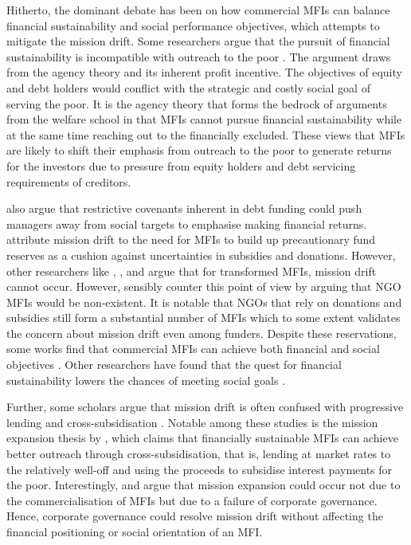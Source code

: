 \documentclass[a4paper, nobind]{templates/ociamthesis}
\begin{document}
Hitherto, the dominant debate has been on how commercial MFIs can balance financial sustainability and social performance objectives, which attempts to mitigate the mission drift. Some researchers argue that the pursuit of financial sustainability is incompatible with outreach to the poor \autocite{cobb2016funding,mia2017mission}. The argument draws from the agency theory and its inherent profit incentive. The objectives of equity and debt holders would conflict with the strategic and costly social goal of serving the poor. It is the agency theory that forms the bedrock of arguments from the welfare school in that MFIs cannot pursue financial sustainability while at the same time reaching out to the financially excluded. These views that MFIs are likely to shift their emphasis from outreach to the poor to generate returns for the investors due to pressure from equity holders and debt servicing requirements of creditors.

\textcite{mersland2019social} also argue that restrictive covenants inherent in debt funding could push managers away from social targets to emphasise making financial returns. \textcite{armendariz2013subsidy} attribute mission drift to the need for MFIs to build up precautionary fund reserves as a cushion against uncertainties in subsidies and donations. However, other researchers like \textcite{im2015profits}, \textcite{lutzenkirchen2012microfinance}, and \textcite{quayes2012depth} argue that for transformed MFIs, mission drift cannot occur. However, \textcite{morduch2019challenges} sensibly counter this point of view by arguing that NGO MFIs would be non-existent. It is notable that NGOs that rely on donations and subsidies still form a substantial number of MFIs \autocite{armendariz2013subsidy} which to some extent validates the concern about mission drift even among funders. Despite these reservations, some works find that commercial MFIs can achieve both financial and social objectives \autocite{kodongo2013individual}. Other researchers have found that the quest for financial sustainability lowers the chances of meeting social goals \autocite{hishigsuren2006transformation}.

Further, some scholars argue that mission drift is often confused with progressive lending and cross-subsidisation \autocite{abeysekera2014sustainability}. Notable among these studies is the mission expansion thesis by \textcite{mersland2010microfinance}, which claims that financially sustainable MFIs can achieve better outreach through cross-subsidisation, that is, lending at market rates to the relatively well-off and using the proceeds to subsidise interest payments for the poor. Interestingly, \textcite{campion1999institutional} and \textcite{ramus2017} argue that mission expansion could occur not due to the commercialisation of MFIs but due to a failure of corporate governance. Hence, corporate governance could resolve mission drift without affecting the financial positioning or social orientation of an MFI.
\end{document}
